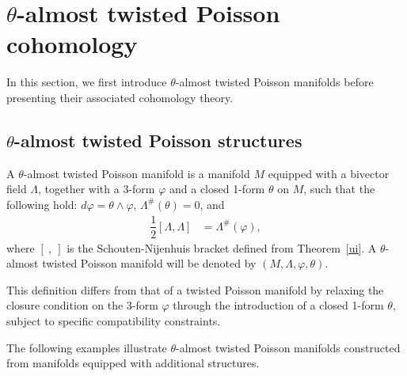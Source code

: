 \documentclass[a4paper,10pt]{article}
\numberwithin{equation}{section}
\theoremstyle{plain}
\begin{document}
	\section{$\theta$-almost twisted Poisson cohomology}\label{sec2}
	In this section, we first introduce $\theta$-almost twisted Poisson manifolds before presenting their associated cohomology theory.
	\subsection{$\theta$-almost twisted Poisson structures}
	A $\theta$-almost twisted Poisson manifold is a manifold $M$ equipped with  a bivector field $\Lambda$,
	together with a 3-form $\varphi$ and a closed  1-form $\theta$ on $M$, such that the following hold: $d\varphi=\theta\wedge\varphi$,
	$\Lambda^\#(\theta)=0$,  and
	\begin{align}\label{Eq2}
	\dfrac{1}{2}[\Lambda,\Lambda] &=\Lambda^\#  (\varphi),
	\end{align}
	where $[\ ,\ ]$ is the Schouten-Nijenhuis bracket defined from Theorem~\ref{ui}.
	A $\theta$-almost twisted Poisson manifold   will be denoted by $(M,\Lambda,\varphi,\theta)$.
	
	This definition differs from that of a twisted Poisson manifold by relaxing the closure condition on the 3-form $\varphi$ through the introduction of a closed 1-form $\theta$, subject to specific compatibility constraints.
	
	The following examples illustrate $\theta$-almost twisted Poisson manifolds constructed from manifolds equipped with additional structures.\\[0.2cm]
\end{document}
